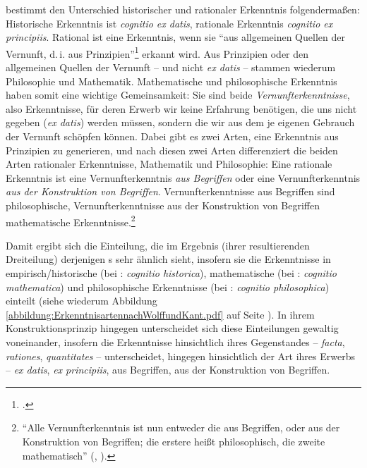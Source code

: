  bestimmt den Unterschied historischer und
rationaler Erkenntnis folgendermaßen: Historische Erkenntnis ist \emph{cognitio
ex datis}, rationale Erkenntnis \emph{cognitio ex principiis}. Rational ist eine
Erkenntnis, wenn sie \enquote{aus allgemeinen Quellen der Vernunft, {\punkt}
d.\,i. aus Prinzipien}\footnote{\cite[][B
864\,f.,]{Kant:KritikderreinenVernunft2003} \cite[][III:
541.15--17]{Kant:GesammelteWerke1900ff.}.} erkannt wird. Aus Prinzipien
oder den allgemeinen Quellen der Vernunft -- und nicht \emph{ex datis} -- stammen wiederum Philosophie und Mathematik. Mathematische und philosophische Erkenntnis haben somit eine wichtige Gemeinsamkeit: Sie sind beide \emph{Vernunfterkenntnisse}, also Erkenntnisse,
für deren Erwerb wir keine Erfahrung benötigen, die uns nicht gegeben (\emph{ex
datis}) werden müssen, sondern die wir aus dem je eigenen Gebrauch der Vernunft
schöpfen können. Dabei gibt es zwei Arten, eine Erkenntnis aus Prinzipien zu
generieren, und nach diesen zwei Arten differenziert  die beiden Arten
rationaler Erkenntnisse, Mathematik und Philosophie: Eine rationale Erkenntnis
ist eine  Vernunfterkenntnis \emph{aus Begriffen}
oder eine  Vernunfterkenntnis \emph{aus der
Konstruktion von Begriffen}. Vernunfterkenntnisse aus Begriffen sind
philosophische, Vernunfterkenntnisse aus der Konstruktion von Begriffen
mathematische
Erkenntnisse.\footnote{\enquote{Alle Vernunfterkenntnis ist nun entweder die
aus Begriffen, oder aus der Konstruktion von Begriffen; die erstere heißt
philosophisch, die zweite mathematisch} \mkbibparens{\cite[][B
865]{Kant:KritikderreinenVernunft2003},
\cite[][III: 541.18--20]{Kant:GesammelteWerke1900ff.}}.}



Damit ergibt sich die Einteilung, die im Ergebnis (ihrer resultierenden
Dreiteilung) derjenigen s sehr ähnlich
sieht, insofern sie die Erkenntnisse in empirisch/historische (bei
: \emph{cognitio historica}),
mathematische (bei : \emph{cognitio
mathematica}) und philosophische Erkenntnisse (bei
: \emph{cognitio philosophica})
einteilt (siehe wiederum
Abbildung \ref{abbildung:ErkenntnisartennachWolffundKant.pdf} auf Seite
\pageref{abbildung:ErkenntnisartennachWolffundKant.pdf}). In ihrem Konstruktionsprinzip hingegen unterscheidet sich diese
Einteilungen gewaltig voneinander, insofern
 die Erkenntnisse hinsichtlich ihres
Gegenstandes -- \emph{facta},
\emph{rationes}, \emph{quantitates} -- unterscheidet, 
hingegen hinsichtlich der Art ihres Erwerbs -- \emph{ex datis}, \emph{ex
principiis}, aus Begriffen, aus der Konstruktion von Begriffen.

